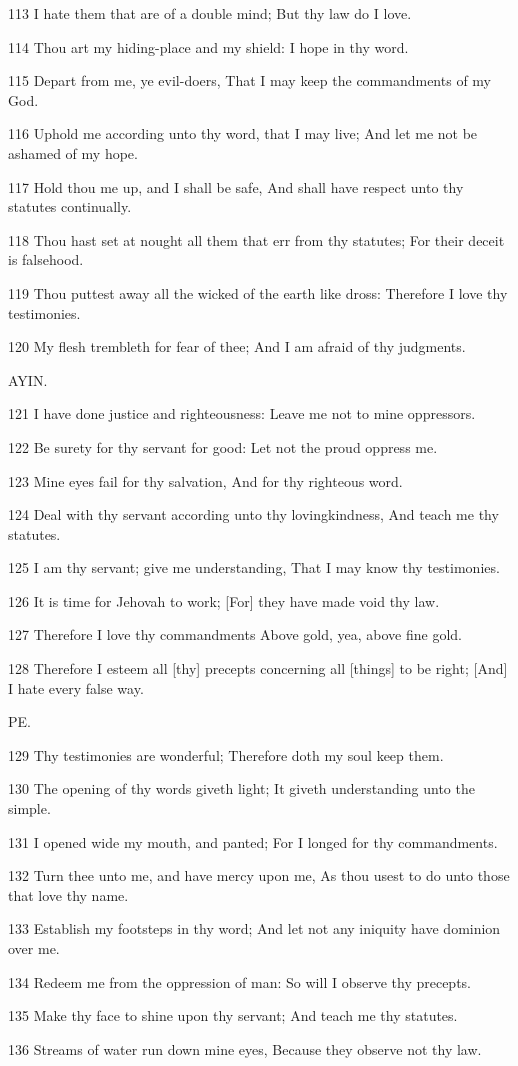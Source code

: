\par 113 I hate them that are of a double mind; But thy law do I love.
\par 114 Thou art my hiding-place and my shield: I hope in thy word.
\par 115 Depart from me, ye evil-doers, That I may keep the commandments of my God.
\par 116 Uphold me according unto thy word, that I may live; And let me not be ashamed of my hope.
\par 117 Hold thou me up, and I shall be safe, And shall have respect unto thy statutes continually.
\par 118 Thou hast set at nought all them that err from thy statutes; For their deceit is falsehood.
\par 119 Thou puttest away all the wicked of the earth like dross: Therefore I love thy testimonies.
\par 120 My flesh trembleth for fear of thee; And I am afraid of thy judgments.

\par AYIN.

\par 121 I have done justice and righteousness: Leave me not to mine oppressors.
\par 122 Be surety for thy servant for good: Let not the proud oppress me.
\par 123 Mine eyes fail for thy salvation, And for thy righteous word.
\par 124 Deal with thy servant according unto thy lovingkindness, And teach me thy statutes.
\par 125 I am thy servant; give me understanding, That I may know thy testimonies.
\par 126 It is time for Jehovah to work; [For] they have made void thy law.
\par 127 Therefore I love thy commandments Above gold, yea, above fine gold.
\par 128 Therefore I esteem all [thy] precepts concerning all [things] to be right; [And] I hate every false way.

\par PE.

\par 129 Thy testimonies are wonderful; Therefore doth my soul keep them.
\par 130 The opening of thy words giveth light; It giveth understanding unto the simple.
\par 131 I opened wide my mouth, and panted; For I longed for thy commandments.
\par 132 Turn thee unto me, and have mercy upon me, As thou usest to do unto those that love thy name.
\par 133 Establish my footsteps in thy word; And let not any iniquity have dominion over me.
\par 134 Redeem me from the oppression of man: So will I observe thy precepts.
\par 135 Make thy face to shine upon thy servant; And teach me thy statutes.
\par 136 Streams of water run down mine eyes, Because they observe not thy law.


